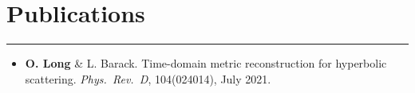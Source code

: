 \documentclass[10.5pt, oneside]{article}   	%
\begin{document}
{\color{Sectioncolour}
\section*{Publications}
\vspace{-3mm}
\noindent\rule{\linewidth}{0.6pt}}
\begin{itemize}
\item {\bf O. Long} \& L. Barack. Time-domain metric reconstruction for hyperbolic scattering. {\it Phys.\ Rev.\ D}, 104(024014), July 2021. \href{https://journals.aps.org/prd/abstract/10.1103/PhysRevD.104.024014}{}
\end{itemize} 

 
\end{document}
